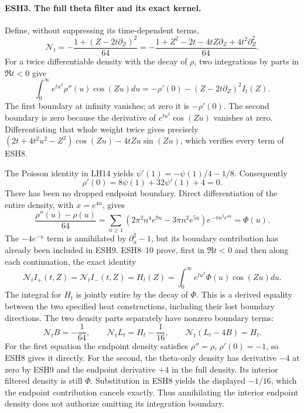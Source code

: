 \paragraph{ESH3. The full theta filter and its exact kernel.}
Define, without suppressing its time-dependent terms,
\[
 \mathcal N_t=-\frac{1+(Z-2t\partial_Z)^2}{64}
 =-\frac{1+Z^2-2t-4tZ\partial_Z+4t^2\partial_Z^2}{64}.
                                                               \tag{ESH7}
\]
For a twice differentiable density with the decay of \(\rho\),
two integrations by parts in \(\Re t<0\) give
\[
 \int_0^\infty e^{tu^2}\rho''(u)\cos(Zu)du
  =-\rho'(0)-(Z-2t\partial_Z)^2 I_t(Z).                  \tag{ESH8}
\]
The first boundary at infinity vanishes; at zero it is
\(-\rho'(0)\). The second boundary is zero because the
derivative of \(e^{tu^2}\cos(Zu)\) vanishes at zero.
Differentiating that whole weight twice gives precisely
\((2t+4t^2u^2-Z^2)\cos(Zu)-4tZu\sin(Zu)\),
which verifies every term of ESH8.

The Poisson identity in LH14 yields
\(\psi'(1)=-\psi(1)/4-1/8\). Consequently
\[
 \rho'(0)=8\psi(1)+32\psi'(1)+4=0.                     \tag{ESH9}
\]
There has been no dropped endpoint boundary. Direct differentiation
of the entire density, with \(x=e^{4u}\), gives
\[
 \frac{\rho''(u)-\rho(u)}{64}
 =\sum_{n\ge1}
   \left(2\pi^2n^4e^{9u}-3\pi n^2e^{5u}\right)e^{-\pi n^2e^{4u}}
 =\Phi(u).                                               \tag{ESH10}
\]
The \(-4e^{-u}\) term is annihilated by \(\partial_u^2-1\),
but its boundary contribution has already been included in ESH9.
ESH8--10 prove, first in \(\Re t<0\) and then along each
continuation, the exact identity
\[
 \mathcal N_t I_+(t,Z)=\mathcal N_t I_-(t,Z)
        =H_t(Z)=\int_0^\infty e^{tu^2}\Phi(u)\cos(Zu)du.
                                                               \tag{ESH11}
\]
The integral for \(H_t\) is jointly entire by the decay of
\(\Phi\). This is a derived equality between the two specified
heat constructions, including their lost boundary directions.
The two density parts separately have nonzero boundary terms:
\[
 \mathcal N_t B=-\frac1{64},\qquad
 \mathcal N_t L_t=H_t-\frac1{16},\qquad
 \mathcal N_t(L_t-4B)=H_t.                              \tag{ESH17}
\]
For the first equation the endpoint density satisfies
\(\rho''=\rho\), \(\rho'(0)=-1\), so ESH8 gives it
directly. For the second, the theta-only density has derivative
\(-4\) at zero by ESH9 and the endpoint derivative \(+4\)
in the full density. Its interior filtered density is still
\(\Phi\). Substitution in ESH8 yields the displayed
\(-1/16\), which the endpoint contribution cancels exactly.
Thus annihilating the interior endpoint density does not authorize
omitting its integration boundary.

